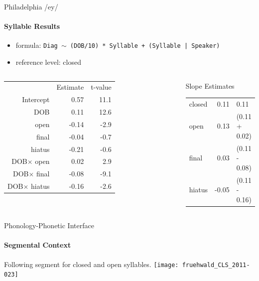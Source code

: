 \documentclass[]{beamer}
\begin{document}
\begin{frame}{Philadelphia /ey/}
	\framesubtitle{Syllable Results}
	\begin{itemize}
		\item [] formula: \texttt{\footnotesize Diag $\sim$ (DOB/10) * Syllable + (Syllable | Speaker)}
		\item [] reference level: closed
	\end{itemize}
	\begin{columns}[c]
		\column{0.49\paperwidth}
	\begin{tabular}{rrr}
		\toprule
		&Estimate & t-value\\
	\cmidrule{2-3}
	Intercept & 0.57 & 11.1\\
	DOB 	  & 0.11 & 12.6\\
	\midrule
	open	  & -0.14 & -2.9\\
	final     & -0.04 & -0.7\\
	hiatus    & -0.21 & -0.6\\
	\midrule
	DOB$\times$ open &  0.02 & 2.9\\
	DOB$\times$ final & -0.08 & -9.1\\
	DOB$\times$ hiatus & -0.16 & -2.6\\
	\bottomrule
	\end{tabular}
		\column{0.49\paperwidth}
		\begin{block}{Slope Estimates}
			\begin{tabular}{lr@{=}l}
				closed & 0.11 & 0.11\\
				open & 0.13 & (0.11 + 0.02) \\
				final & 0.03 & (0.11 - 0.08) \\
				hiatus & -0.05 & (0.11 - 0.16)
			\end{tabular}
		\end{block}
	\end{columns}
\end{frame}


\begin{frame}{Phonology-Phonetic Interface}
	\framesubtitle{Segmental Context}

Following segment for closed and open syllables.
\texttt{[image: fruehwald\_CLS\_2011-023]}
		
\end{frame}
\end{document}
